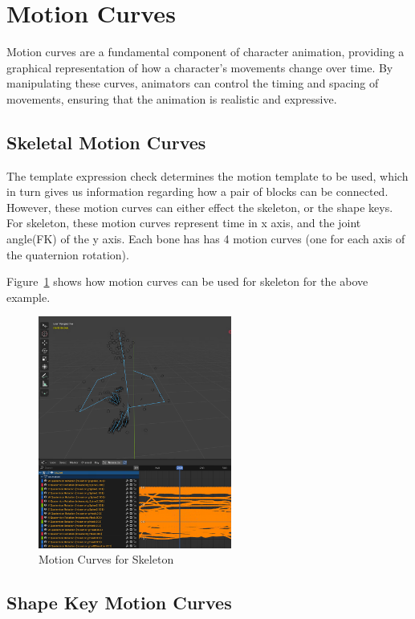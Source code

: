\documentclass[../../main.tex]{subfiles}
\begin{document}
\section{Motion Curves}
\label{ch:intermediate_blocks:curves}

Motion curves are a fundamental component of character animation, providing a graphical representation of how a character's movements change over time. By manipulating these curves, animators can control the timing and spacing of movements, ensuring that the animation is realistic and expressive.

\subsection{Skeletal Motion Curves}
\label{ch:intermediate_blocks:curves:skeletal}

The template expression check determines the motion template to be used, which in turn gives us information regarding how a pair of blocks can be connected. However, these motion curves can either effect the skeleton, or the shape keys. For skeleton, these motion curves represent time in x axis, and the joint angle(FK) of the y axis. Each bone has has 4 motion curves (one for each axis of the quaternion rotation).

Figure~\ref{fig:motion_curves_skeletal} shows how motion curves can be used for skeleton for the above example.

\begin{figure}
    \centering \includegraphics[width = 2.5in]{chapters/intermediate_blocks/images/motion_curves_skeletal.png}
    \caption{Motion Curves for Skeleton}
    \label{fig:motion_curves_skeletal}
\end{figure}

\subsection{Shape Key Motion Curves}
\label{ch:intermediate_blocks:curves:shape_keys}
\end{document}
